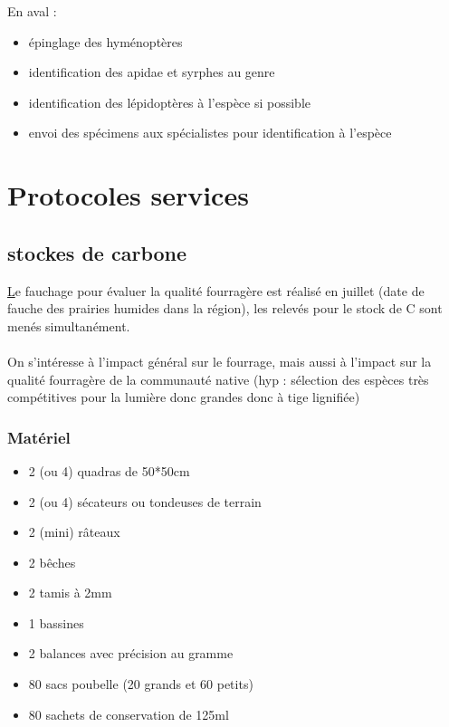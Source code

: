 \documentclass{article}
\begin{document}
	En aval :
	\begin{itemize}
		\item épinglage des hyménoptères
		\item identification des apidae et syrphes au genre
		\item identification des lépidoptères à l'espèce si possible
		\item envoi des spécimens aux spécialistes pour identification à l'espèce
	\end{itemize}
	\pagebreak

	\section{Protocoles services}
	\subsection{stockes de carbone}
	\underline Le fauchage pour évaluer la qualité fourragère est réalisé en juillet (date de fauche des prairies humides dans la région), les relevés pour le stock de C sont menés simultanément.
	\paragraph{}On s'intéresse à l'impact général sur le fourrage, mais aussi à l'impact sur la qualité fourragère de la communauté native (hyp : sélection des espèces très compétitives pour la lumière donc grandes donc à tige lignifiée)
	\subsubsection{Matériel}
	\begin{itemize}
		\item 2 (ou 4) quadras de 50*50cm
		\item 2 (ou 4) sécateurs ou tondeuses de terrain
		\item 2 (mini) râteaux 
		\item 2 bêches
		\item 2 tamis à 2mm
		\item 1 bassines
		\item 2 balances avec précision au gramme
		\item 80 sacs poubelle (20 grands et 60 petits)
		\item 80 sachets de conservation de 125ml
	\end{itemize}
\end{document}
